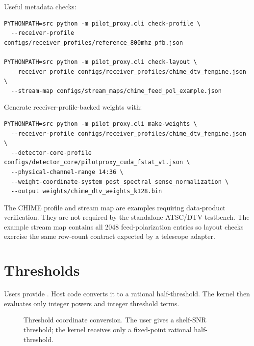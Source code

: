 \documentclass[10pt,letterpaper]{article}
\newcommand{\code}[1]{\texttt{\detokenize{#1}}}
\begin{document}
Useful metadata checks:
\begin{lstlisting}[style=shell]
PYTHONPATH=src python -m pilot_proxy.cli check-profile \
  --receiver-profile configs/receiver_profiles/reference_800mhz_pfb.json

PYTHONPATH=src python -m pilot_proxy.cli check-layout \
  --receiver-profile configs/receiver_profiles/chime_dtv_fengine.json \
  --stream-map configs/stream_maps/chime_feed_pol_example.json
\end{lstlisting}

Generate receiver-profile-backed weights with:
\begin{lstlisting}[style=shell]
PYTHONPATH=src python -m pilot_proxy.cli make-weights \
  --receiver-profile configs/receiver_profiles/chime_dtv_fengine.json \
  --detector-core-profile configs/detector_core/pilotproxy_cuda_fstat_v1.json \
  --physical-channel-range 14:36 \
  --weight-coordinate-system post_spectral_sense_normalization \
  --output weights/chime_dtv_weights_k128.bin
\end{lstlisting}

The CHIME profile and stream map are examples requiring data-product
verification.  They are not required by the standalone ATSC/DTV testbench.  The
example stream map contains all 2048 feed-polarization entries so layout checks
exercise the same row-count contract expected by a telescope adapter.

\section{Thresholds}

Users provide \code{threshold_snr_shelf_db}.  Host code converts it to a rational half-threshold.  The kernel then evaluates only integer powers and integer threshold terms.


\begin{figure}[H]
\centering
{}
\caption{Threshold coordinate conversion.  The user gives a shelf-SNR threshold; the kernel receives only a fixed-point rational half-threshold.}
\label{fig:threshold_conversion}
\end{figure}
\end{document}
